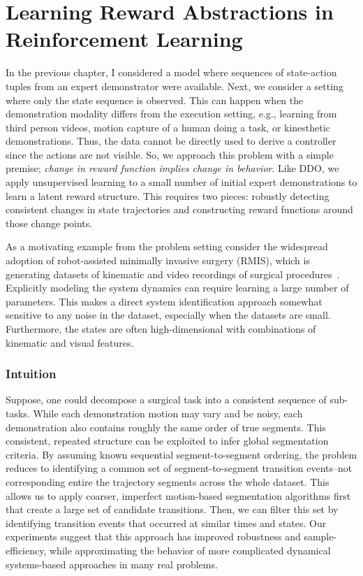 \chapter{Learning Reward Abstractions in Reinforcement Learning}
In the previous chapter, I considered a model where sequences of state-action tuples from an expert demonstrator were available.
Next, we consider a setting where only the state sequence is observed.
This can happen when the demonstration modality differs from the execution setting, e.g., learning from third person videos, motion capture of a human doing a task, or kinesthetic demonstrations. 
Thus, the data cannot be directly used to derive a controller since the actions are not visible.
So, we approach this problem with a simple premise;  \emph{change in reward function implies change in behavior}.
Like DDO, we apply unsupervised learning to a small number of initial expert demonstrations to learn a latent reward structure. This requires two pieces: robustly detecting consistent changes in state trajectories and constructing reward functions around those change points.

As a motivating example from the problem setting consider the widespread adoption of robot-assisted minimally invasive surgery (RMIS), which is generating datasets of kinematic and video recordings of surgical procedures~\cite{gao2014jigsaws}.
Explicitly modeling the system dynamics can require learning a large number of parameters.
This makes a direct system identification approach somewhat sensitive to any noise in the dataset, especially when the datasets are small. 
Furthermore, the states are often high-dimensional with combinations of kinematic and visual features.

\subsection*{Intuition}
Suppose, one could decompose a surgical task into a consistent sequence of sub-tasks.
While each demonstration motion may vary and be noisy, each demonstration also contains roughly the same order of true segments.
This consistent, repeated structure can be exploited to infer global segmentation criteria.
By assuming known sequential segment-to-segment ordering, the problem reduces to identifying a common set of segment-to-segment transition events--not corresponding entire the trajectory segments across the whole dataset.
This allows us to apply coarser, imperfect motion-based segmentation algorithms first that create a large set of candidate transitions.
Then, we can filter this set by identifying transition events that occurred at similar times and states.
Our experiments suggest that this approach has improved robustness and sample-efficiency, while approximating the behavior of more complicated dynamical systems-based approaches in many real problems.

